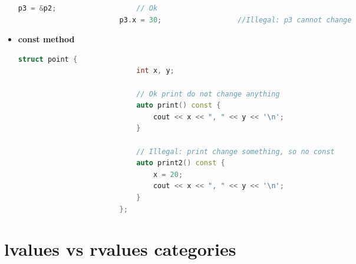 \documentclass[12pt, fleqn]{report}                             %
\theoremstyle{break}                                            %
\begin{document}
\begin{itemize}
\begin{lstlisting}[language=C++, gobble=24]
                        p3 = &p2;                   // Ok
                        p3.x = 30;                  //Illegal: p3 cannot change
                    \end{lstlisting}

                \clearpage
                \item \textbf{const method}
                    \begin{lstlisting}[language=C++, gobble=24]
                        struct point {
                            int x, y;

                            // Ok print do not change anything
                            auto print() const {                   
                                cout << x << ", " << y << '\n';
                            }

                            // Illegal: print change something, so no const
                            auto print2() const { 
                                x = 20;                  
                                cout << x << ", " << y << '\n';
                            }
                        };
                    \end{lstlisting}

            \end{itemize}
            
            

        \section{lvalues vs rvalues categories}
\end{document}
